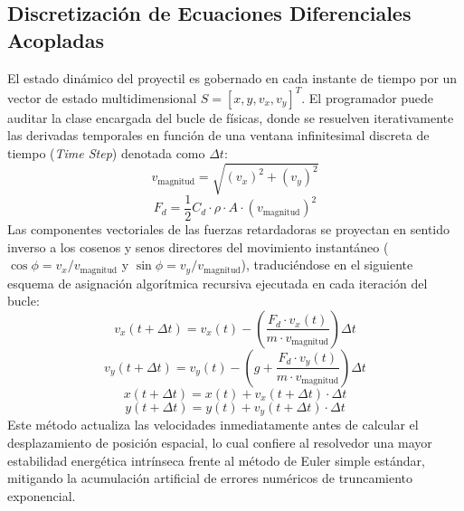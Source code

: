 \documentclass[11pt,a4paper]{article}
\begin{document}
	\subsection{Discretización de Ecuaciones Diferenciales Acopladas}
	El estado dinámico del proyectil es gobernado en cada instante de tiempo por un vector de estado multidimensional $S = [x, y, v_x, v_y]^T$. El programador puede auditar la clase encargada del bucle de físicas, donde se resuelven iterativamente las derivadas temporales en función de una ventana infinitesimal discreta de tiempo (\textit{Time Step}) denotada como $\Delta t$:
	\begin{equation}
		v_{\text{magnitud}} = \sqrt{(v_x)^2 + (v_y)^2}
	\end{equation}
	\begin{equation}
		F_d = \frac{1}{2} C_d \cdot \rho \cdot A \cdot (v_{\text{magnitud}})^2
	\end{equation}
	Las componentes vectoriales de las fuerzas retardadoras se proyectan en sentido inverso a los cosenos y senos directores del movimiento instantáneo ($\cos\phi = v_x / v_{\text{magnitud}}$ y $\sin\phi = v_y / v_{\text{magnitud}}$), traduciéndose en el siguiente esquema de asignación algorítmica recursiva ejecutada en cada iteración del bucle:
	\begin{equation}
		v_x(t + \Delta t) = v_x(t) - \left( \frac{F_d \cdot v_x(t)}{m \cdot v_{\text{magnitud}}} \right) \Delta t
	\end{equation}
	\begin{equation}
		v_y(t + \Delta t) = v_y(t) - \left( g + \frac{F_d \cdot v_y(t)}{m \cdot v_{\text{magnitud}}} \right) \Delta t
	\end{equation}
	\begin{equation}
		x(t + \Delta t) = x(t) + v_x(t + \Delta t) \cdot \Delta t
	\end{equation}
	\begin{equation}
		y(t + \Delta t) = y(t) + v_y(t + \Delta t) \cdot \Delta t
	\end{equation}
	Este método actualiza las velocidades inmediatamente antes de calcular el desplazamiento de posición espacial, lo cual confiere al resolvedor una mayor estabilidad energética intrínseca frente al método de Euler simple estándar, mitigando la acumulación artificial de errores numéricos de truncamiento exponencial.
	
\end{document}
